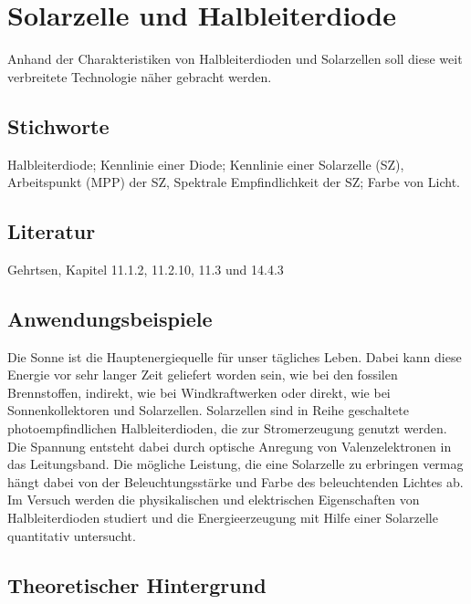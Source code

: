 \chapter{Solarzelle und Halbleiterdiode}
\label{v:17}

Anhand der Charakteristiken von Halbleiterdioden und Solarzellen soll diese weit verbreitete Technologie näher gebracht werden.

\section{Stichworte}

Halbleiterdiode; Kennlinie einer Diode; Kennlinie einer Solarzelle (SZ), Arbeitspunkt (MPP) der SZ, Spektrale Empfindlichkeit der SZ; Farbe von Licht.
%
\section{Literatur}

Gehrtsen, Kapitel 11.1.2, 11.2.10, 11.3 und 14.4.3
%
\section{Anwendungsbeispiele}

Die Sonne ist die Hauptenergiequelle für unser tägliches Leben. Dabei kann diese Energie vor sehr langer Zeit geliefert worden sein, wie bei den fossilen Brennstoffen, indirekt, wie bei Windkraftwerken oder direkt, wie bei Sonnenkollektoren und Solarzellen. Solarzellen sind in Reihe geschaltete photoempfindlichen Halbleiterdioden, die zur Stromerzeugung genutzt werden. Die Spannung entsteht dabei durch optische Anregung von Valenzelektronen in das Leitungsband. Die mögliche Leistung, die eine Solarzelle zu erbringen vermag hängt dabei von der Beleuchtungsstärke und Farbe des beleuchtenden Lichtes ab. Im Versuch werden die physikalischen und elektrischen Eigenschaften von Halbleiterdioden studiert und die Energieerzeugung mit Hilfe einer Solarzelle quantitativ untersucht.

\section{Theoretischer Hintergrund}

